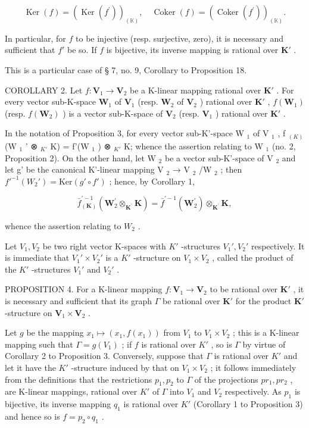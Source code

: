 \[
\operatorname{Ker} (f) = (\operatorname{Ker} (f ^ {\prime})) _ {(\mathbb {K})}, \quad \operatorname{Coker} (f) = (\operatorname{Coker} (f ^ {\prime})) _ {(\mathbb {K})}.
\]

In particular, for \(f\) to be injective (resp. surjective, zero), it is necessary and sufficient that \(f'\) be so. If \(f\) is bijective, its inverse mapping is rational over \(\mathbf{K}'\) .

This is a particular case of § 7, no. 9, Corollary to Proposition 18.

COROLLARY 2. Let \(f: \mathbf{V}_1 \to \mathbf{V}_2\) be a K-linear mapping rational over \(\mathbf{K}'\) . For every vector sub-K-space \(\mathbf{W}_1\) of \(\mathbf{V}_1\) (resp. \(\mathbf{W}_2\) of \(\mathbf{V}_2\) ) rational over \(\mathbf{K}'\) , \(f(\mathbf{W}_1)\) (resp. \(f(\mathbf{W}_2)\) ) is a vector sub-K-space of \(\mathbf{V}_2\) (resp. \(\mathbf{V}_1\) ) rational over \(\mathbf{K}'\) .

In the notation of Proposition 3, for every vector sub-K'-space W \(_{1}\) of V \(_{1}\) , f \(_{(K)}\) (W \(_{1}\) ' ⊗ \(_{K'}\) K) = f'(W \(_{1}\) ) ⊗ \(_{K'}\) K; whence the assertion relating to W \(_{1}\) (no. 2, Proposition 2). On the other hand, let W \(_{2}\) be a vector sub-K'-space of V \(_{2}\) and let g' be the canonical K'-linear mapping V \(_{2}\) → V \(_{2}\) /W \(_{2}\) ; then \(f'^{-1}(W_{2}') = \text{Ker}(g' \circ f')\) ; hence, by Corollary 1,

\[
\bar {f} _ {(\mathbf {K})} ^ {\prime - 1} (\mathbf {W} _ {2} ^ {\prime} \otimes_ {\mathbf {K} ^ {\prime}} \mathbf {K}) = \bar {f} ^ {\prime - 1} (\mathbf {W} _ {2} ^ {\prime}) \otimes_ {\mathbf {K} ^ {\prime}} \mathbf {K},
\]

whence the assertion relating to \(W_{2}\) .

Let \(V_{1}, V_{2}\) be two right vector K-spaces with \(K'\) -structures \(V_{1}', V_{2}'\) respectively. It is immediate that \(V_{1}' \times V_{2}'\) is a \(K'\) -structure on \(V_{1} \times V_{2}\) , called the product of the \(K'\) -structures \(V_{1}'\) and \(V_{2}'\) .

PROPOSITION 4. For a K-linear mapping \(f: \mathbf{V}_1 \to \mathbf{V}_2\) to be rational over \(\mathbf{K}'\) , it is necessary and sufficient that its graph \(\Gamma\) be rational over \(\mathbf{K}'\) for the product \(\mathbf{K}'\) -structure on \(\mathbf{V}_1 \times \mathbf{V}_2\) .

Let \(g\) be the mapping \(x_1 \mapsto (x_1, f(x_1))\) from \(V_1\) to \(V_1 \times V_2\) ; this is a K-linear mapping such that \(\Gamma = g(V_1)\) ; if \(f\) is rational over \(K'\) , so is \(\Gamma\) by virtue of Corollary 2 to Proposition 3. Conversely, suppose that \(\Gamma\) is rational over \(K'\) and let it have the \(K'\) -structure induced by that on \(V_1 \times V_2\) ; it follows immediately from the definitions that the restrictions \(p_1, p_2\) to \(\Gamma\) of the projections \(pr_1, pr_2\) , are K-linear mappings, rational over \(K'\) of \(\Gamma\) into \(V_1\) and \(V_2\) respectively. As \(p_1\) is bijective, its inverse mapping \(q_1\) is rational over \(K'\) (Corollary 1 to Proposition 3) and hence so is \(f = p_2 \circ q_1\) .

